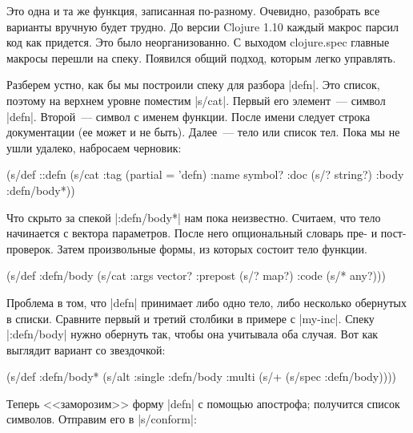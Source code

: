 Это одна и та же функция, записанная по-разному. Очевидно, разобрать все
варианты вручную будет трудно. До версии Clojure 1.10 каждый макрос парсил код
как придется. Это было неорганизованно. С выходом clojure.spec главные макросы
перешли на спеку. Появился общий подход, которым легко управлять.

Разберем устно, как бы мы построили спеку для разбора \spverb|defn|. Это список,
поэтому на верхнем уровне поместим \spverb|s/cat|. Первый его элемент~--- символ
\spverb|defn|. Второй~--- символ с именем функции. После имени следует строка
документации (ее может и не быть). Далее~--- тело или список тел. Пока мы не
ушли удалеко, набросаем черновик:

\begin{english}
  \begin{clojure}
(s/def ::defn
  (s/cat :tag (partial = 'defn)
         :name symbol?
         :doc (s/? string?)
         :body :defn/body*))
  \end{clojure}
\end{english}

Что скрыто за спекой \spverb|:defn/body*| нам пока неизвестно. Считаем, что тело
начинается с вектора параметров. После него опциональный словарь пре- и пост-
проверок. Затем произвольные формы, из которых состоит тело функции.

\begin{english}
  \begin{clojure}
(s/def :defn/body
  (s/cat :args vector?
         :prepost (s/? map?)
         :code (s/* any?)))
  \end{clojure}
\end{english}

Проблема в том, что \spverb|defn| принимает либо одно тело, либо несколько
обернутых в списки. Сравните первый и третий столбики в примере с
\spverb|my-inc|. Спеку \spverb|:defn/body| нужно обернуть так, чтобы она
учитывала оба случая. Вот как выглядит вариант со звездочкой:

\begin{english}
  \begin{clojure}
(s/def :defn/body*
  (s/alt :single :defn/body
         :multi (s/+ (s/spec :defn/body))))
  \end{clojure}
\end{english}

Теперь <<заморозим>> форму \spverb|defn| с помощью апострофа; получится список
символов. Отправим его в \spverb|s/conform|:

\begin{english}
\end{english}

